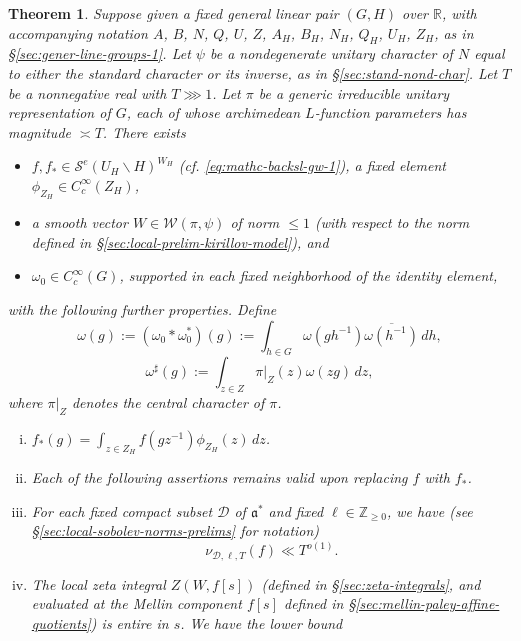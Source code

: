 \documentclass[reqno]{amsart}
\theoremstyle{plain} \newtheorem{theorem} {Theorem}
\theoremstyle{definition} \newtheorem{definition} [theorem] {Definition}
\theoremstyle{itplain} %
\numberwithin{equation}{section}
\numberwithin{theorem}{section}
\renewcommand{\geq}{\geqslant}
\renewcommand{\leq}{\leqslant}
\begin{document}
\begin{theorem}\label{thm:main-local-results}
  Suppose given a fixed general linear pair $(G,H)$ over $\mathbb{R}$, with accompanying notation $A$, $B$, $N$, $Q$, $U$, $Z$, $A_H$, $B_H$, $N_H$, $Q_H$, $U_H$, $Z_H$, as in \S\ref{sec:gener-line-groups-1}.  Let $\psi$ be a nondegenerate unitary character of $N$ equal to either the standard character or its inverse, as in \S\ref{sec:stand-nond-char}.  Let $T$ be a nonnegative real with $T \ggg 1$.  Let $\pi$ be a generic irreducible unitary representation of $G$, each of whose archimedean $L$-function parameters has magnitude $\asymp T$.  There exists
\begin{itemize}
\item $f, f_{\ast} \in \mathcal{S}^e(U_H \backslash H)^{W_H}$ (cf. \eqref{eq:mathc-backsl-gw-1}), a fixed element $\phi_{Z_H} \in C_c^\infty(Z_H)$,
\item a smooth vector $W \in \mathcal{W}(\pi,\psi)$ of norm $\leq 1$ (with respect to the norm defined in \S\ref{sec:local-prelim-kirillov-model}), and
\item $\omega_0 \in C_c^\infty(G)$, supported in each fixed neighborhood of the identity element,
\end{itemize}
with the following further properties.  Define
\begin{equation*}
  \omega(g) := (\omega_0 \ast \omega_0^*)(g) := \int _{h \in G} \omega(g h^{-1}) \overline{\omega(h^{-1})} \, d h,
\end{equation*}
\begin{equation*}
  \omega^\sharp (g) := \int _{z \in Z}
  \pi|_Z (z) \omega(z g) \, d z,
\end{equation*}
where $\pi|_Z$ denotes the central character of $\pi$.
\begin{enumerate}[(i)]
\item \label{itm:sub-gln:5} $f_{\ast}(g) = \int _{z \in Z_H} f(g z^{-1}) \phi_{Z_H}(z) \, d z$.
\item \label{itm:sub-gln:6} Each of the following assertions remains valid upon replacing $f$ with $f_{\ast}$.
\item \label{itm:sub-gln:7} For each fixed compact subset $\mathcal{D}$ of $\mathfrak{a}^*$ and fixed $\ell \in \mathbb{Z}_{\geq 0}$, we have (see \S\ref{sec:local-sobolev-norms-prelims} for notation)
  \begin{equation*}
    \nu_{\mathcal{D},\ell,T}(f) \ll T^{o(1)}.
  \end{equation*}
\item \label{itm:sub-gln:8} The local zeta integral $Z(W,f[s])$ (defined in \S\ref{sec:zeta-integrals}, and evaluated at the Mellin component $f[s]$ defined in \S\ref{sec:mellin-paley-affine-quotients}) is entire in $s$.  We have the lower bound

\end{enumerate}
\end{theorem}
\end{document}
